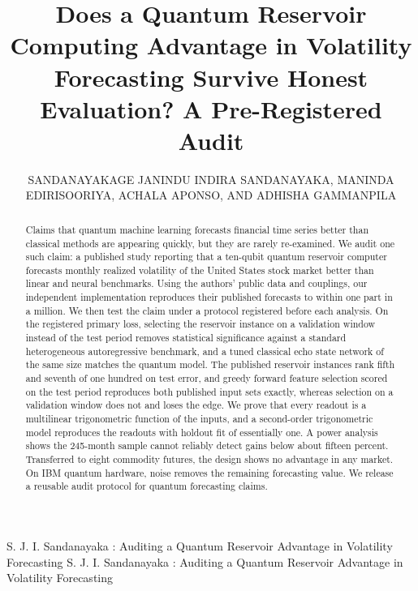 \documentclass{ieeeaccess}
\begin{document}

\title{Does a Quantum Reservoir Computing Advantage in Volatility Forecasting Survive Honest Evaluation? A Pre-Registered Audit}

\author{\uppercase{Sandanayakage Janindu Indira Sandanayaka},
\uppercase{Maninda Edirisooriya}, \uppercase{Achala Aponso}, AND \uppercase{Adhisha Gammanpila}}

\address[1]{Informatics Institute of Technology, Colombo, Sri Lanka, in collaboration with the University of Westminster, London, U.K. (e-mail: janindu.20232270@iit.ac.lk)}


\markboth
{S. J. I. Sandanayaka \headeretal: Auditing a Quantum Reservoir Advantage in Volatility Forecasting}
{S. J. I. Sandanayaka \headeretal: Auditing a Quantum Reservoir Advantage in Volatility Forecasting}


\begin{abstract}
Claims that quantum machine learning forecasts financial time series better than classical methods are appearing quickly, but they are rarely re-examined. We audit one such claim: a published study reporting that a ten-qubit quantum reservoir computer forecasts monthly realized volatility of the United States stock market better than linear and neural benchmarks. Using the authors' public data and couplings, our independent implementation reproduces their published forecasts to within one part in a million. We then test the claim under a protocol registered before each analysis. On the registered primary loss, selecting the reservoir instance on a validation window instead of the test period removes statistical significance against a standard heterogeneous autoregressive benchmark, and a tuned classical echo state network of the same size matches the quantum model. The published reservoir instances rank fifth and seventh of one hundred on test error, and greedy forward feature selection scored on the test period reproduces both published input sets exactly, whereas selection on a validation window does not and loses the edge. We prove that every readout is a multilinear trigonometric function of the inputs, and a second-order trigonometric model reproduces the readouts with holdout fit of essentially one. A power analysis shows the 245-month sample cannot reliably detect gains below about fifteen percent. Transferred to eight commodity futures, the design shows no advantage in any market. On IBM quantum hardware, noise removes the remaining forecasting value. We release a reusable audit protocol for quantum forecasting claims.
\end{abstract}
\end{document}
